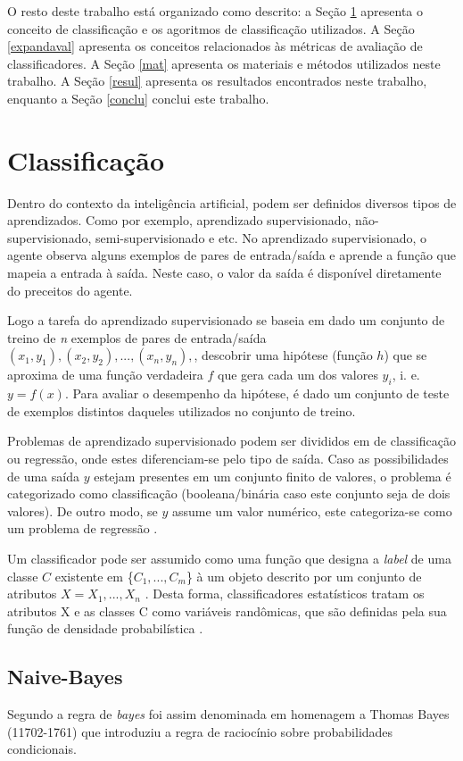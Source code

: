 \documentclass[12pt]{article}
\begin{document}
    O resto deste trabalho está organizado como descrito: a Seção \ref{classi} apresenta o conceito de classificação e os agoritmos de classificação utilizados. A Seção \ref{expandaval} apresenta os conceitos relacionados às métricas de avaliação de classificadores. A Seção \ref{mat} apresenta os materiais e métodos utilizados neste trabalho. A Seção \ref{resul} apresenta os resultados encontrados neste trabalho, enquanto a Seção \ref{conclu} conclui este trabalho.
    
\section{Classificação} \label{classi}
    Dentro do contexto da inteligência artificial, podem ser definidos diversos tipos de aprendizados. Como por exemplo, aprendizado supervisionado, não-supervisionado, semi-supervisionado e etc. No aprendizado supervisionado, o agente observa alguns exemplos de pares de entrada/saída e aprende a função que mapeia a entrada à saída. Neste caso, o valor da saída é disponível diretamente do preceitos do agente. 
    
    Logo a tarefa do aprendizado supervisionado se baseia em dado um conjunto de treino de \textit{n} exemplos de pares de entrada/saída $(x_1, y_1), (x_2, y_2), ..., (x_n, y_n),$, descobrir uma hipótese (função $h$)  que se aproxima de uma função verdadeira $f$ que gera cada um dos valores $y_i$, i. e. $y = f(x)$. Para avaliar o desempenho da hipótese, é dado um conjunto de teste de exemplos distintos daqueles utilizados no conjunto de treino.
    
    Problemas de aprendizado supervisionado podem ser divididos em de classificação ou regressão, onde estes diferenciam-se pelo tipo de saída. Caso as possibilidades de uma saída $y$ estejam presentes em um conjunto finito de valores, o problema é categorizado como classificação (booleana/binária caso este conjunto seja de dois valores). De outro modo, se $y$ assume um valor numérico, este categoriza-se como um problema de regressão \cite{norvig}.

    Um classificador pode ser assumido como uma função que designa a \textit{label} de uma classe $C$ existente em \{$C_1, ..., C_m$\} à um objeto descrito por um conjunto de atributos $X = {X_1, ..., X_n}$ . Desta forma, classificadores estatísticos tratam os atributos X e as classes C como variáveis randômicas, que são definidas pela sua função de densidade probabilística \cite{bnc}.

    \subsection{Naive-Bayes} \label{class}
        Segundo \cite{norvig} a regra de \textit{bayes} foi assim denominada em homenagem a Thomas Bayes (11702-1761) que introduziu a regra de raciocínio sobre probabilidades condicionais.
        
\end{document}
